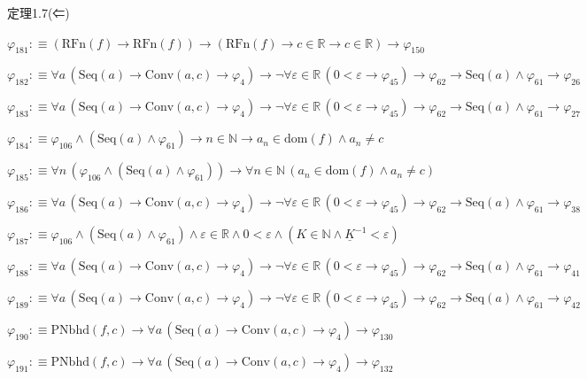 \begin{fullproof}{定理1.7(⇐)}
\begin{abbrevlist}
\item $\varphi_{181} :\equiv (\mathrm{RFn}(f) \to \mathrm{RFn}(f)) \to (\mathrm{RFn}(f) \to c \in \mathbb{R} \to c \in \mathbb{R}) \to \varphi_{150}$
\item $\varphi_{182} :\equiv \forall a\,(\mathrm{Seq}(a) \to \mathrm{Conv}(a,c) \to \varphi_{4}) \to \neg \forall \varepsilon \in \mathbb{R}\,(0 < \varepsilon \to \varphi_{45}) \to \varphi_{62} \to \mathrm{Seq}(a) \land \varphi_{61} \to \varphi_{26}$
\item $\varphi_{183} :\equiv \forall a\,(\mathrm{Seq}(a) \to \mathrm{Conv}(a,c) \to \varphi_{4}) \to \neg \forall \varepsilon \in \mathbb{R}\,(0 < \varepsilon \to \varphi_{45}) \to \varphi_{62} \to \mathrm{Seq}(a) \land \varphi_{61} \to \varphi_{27}$
\item $\varphi_{184} :\equiv \varphi_{106} \land (\mathrm{Seq}(a) \land \varphi_{61}) \to n \in \mathbb{N} \to a_{n} \in \mathrm{dom}(f) \land a_{n} \neq c$
\item $\varphi_{185} :\equiv \forall n\,(\varphi_{106} \land (\mathrm{Seq}(a) \land \varphi_{61})) \to \forall n \in \mathbb{N}\,(a_{n} \in \mathrm{dom}(f) \land a_{n} \neq c)$
\item $\varphi_{186} :\equiv \forall a\,(\mathrm{Seq}(a) \to \mathrm{Conv}(a,c) \to \varphi_{4}) \to \neg \forall \varepsilon \in \mathbb{R}\,(0 < \varepsilon \to \varphi_{45}) \to \varphi_{62} \to \mathrm{Seq}(a) \land \varphi_{61} \to \varphi_{38}$
\item $\varphi_{187} :\equiv \varphi_{106} \land (\mathrm{Seq}(a) \land \varphi_{61}) \land \varepsilon \in \mathbb{R} \land 0 < \varepsilon \land (K \in \mathbb{N} \land \underline{K}^{-1} < \varepsilon)$
\item $\varphi_{188} :\equiv \forall a\,(\mathrm{Seq}(a) \to \mathrm{Conv}(a,c) \to \varphi_{4}) \to \neg \forall \varepsilon \in \mathbb{R}\,(0 < \varepsilon \to \varphi_{45}) \to \varphi_{62} \to \mathrm{Seq}(a) \land \varphi_{61} \to \varphi_{41}$
\item $\varphi_{189} :\equiv \forall a\,(\mathrm{Seq}(a) \to \mathrm{Conv}(a,c) \to \varphi_{4}) \to \neg \forall \varepsilon \in \mathbb{R}\,(0 < \varepsilon \to \varphi_{45}) \to \varphi_{62} \to \mathrm{Seq}(a) \land \varphi_{61} \to \varphi_{42}$
\item $\varphi_{190} :\equiv \mathrm{PNbhd}(f,c) \to \forall a\,(\mathrm{Seq}(a) \to \mathrm{Conv}(a,c) \to \varphi_{4}) \to \varphi_{130}$
\item $\varphi_{191} :\equiv \mathrm{PNbhd}(f,c) \to \forall a\,(\mathrm{Seq}(a) \to \mathrm{Conv}(a,c) \to \varphi_{4}) \to \varphi_{132}$

\end{abbrevlist}
\end{fullproof}
